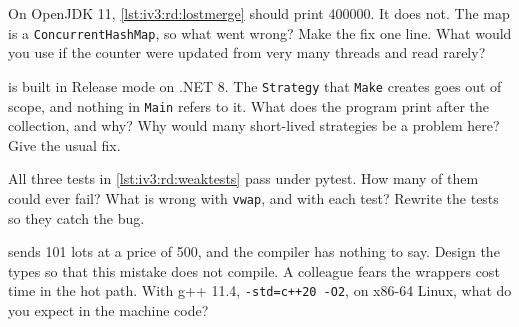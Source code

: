 \begin{question}\label{iq:iv3:reading-debugging-and-software-design:24}
On OpenJDK 11, \cref{lst:iv3:rd:lostmerge} should print 400000. It does not. The map is a \texttt{ConcurrentHashMap}, so what went wrong? Make the fix one line. What would you use if the counter were updated from very many threads and read rarely?
\label{lst:iv3:rd:lostmerge}
\end{question}

\begin{question}\label{iq:iv3:reading-debugging-and-software-design:25}
 is built in Release mode on .NET 8. The \texttt{Strategy} that \texttt{Make} creates goes out of scope, and nothing in \texttt{Main} refers to it. What does the program print after the collection, and why? Why would many short-lived strategies be a problem here? Give the usual fix.
\label{lst:iv3:rd:eventleak}
\end{question}

\begin{question}\label{iq:iv3:reading-debugging-and-software-design:26}
All three tests in \cref{lst:iv3:rd:weaktests} pass under pytest. How many of them could ever fail? What is wrong with \texttt{vwap}, and with each test? Rewrite the tests so they catch the bug.
\label{lst:iv3:rd:weaktests}
\end{question}

\begin{question}\label{iq:iv3:reading-debugging-and-software-design:27}
 sends 101 lots at a price of 500, and the compiler has nothing to say. Design the types so that this mistake does not compile. A colleague fears the wrappers cost time in the hot path. With g++ 11.4, \texttt{-std=c++20 -O2}, on x86-64 Linux, what do you expect in the machine code?
\label{lst:iv3:rd:swapped}
\end{question}

